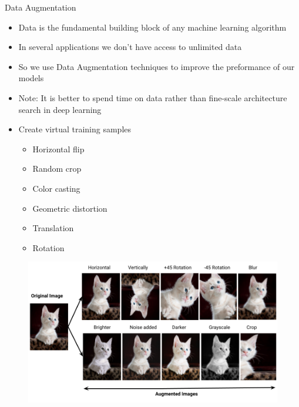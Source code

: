 \documentclass[10pt]{beamer}
\theoremstyle{remark}
\theoremstyle{definition}
\begin{document}
\begin{frame}[allowframebreaks]{Data Augmentation}
\begin{itemize}
    \item Data is the fundamental building block of any machine learning algorithm
    \item In several applications we don’t have access to unlimited data
    \item So we use Data Augmentation techniques to improve the preformance of our models
    \item Note: It is better to spend time on data rather than fine-scale architecture search in deep learning

\end{itemize}

\framebreak

\begin{itemize}
    \item Create virtual training samples
    \begin{itemize}
        \item Horizontal flip
        \item Random crop
        \item Color casting
        \item Geometric distortion
        \item Translation
        \item Rotation
    \end{itemize}

\end{itemize}

\framebreak
    \begin{figure}
    \centering
    \includegraphics[width=1.0\textwidth,height=1.0\textheight,keepaspectratio]{./images/data_augmentation.png}
    \end{figure}
\end{frame}
\end{document}
